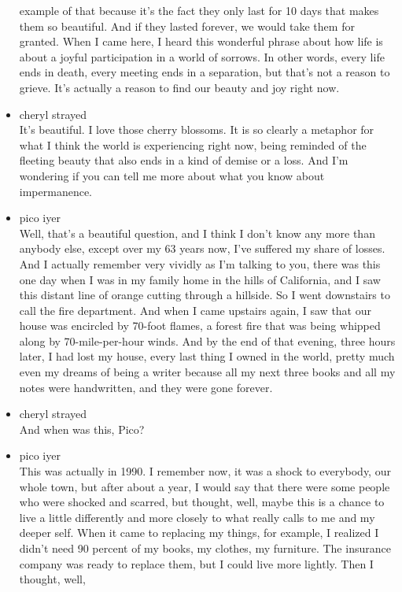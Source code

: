 \begin{itemize}
  example of that because it's the fact they only last for 10 days that
  makes them so beautiful. And if they lasted forever, we would take
  them for granted. When I came here, I heard this wonderful phrase
  about how life is about a joyful participation in a world of sorrows.
  In other words, every life ends in death, every meeting ends in a
  separation, but that's not a reason to grieve. It's actually a reason
  to find our beauty and joy right now.
\item
  cheryl strayed\\
  It's beautiful. I love those cherry blossoms. It is so clearly a
  metaphor for what I think the world is experiencing right now, being
  reminded of the fleeting beauty that also ends in a kind of demise or
  a loss. And I'm wondering if you can tell me more about what you know
  about impermanence.
\item
  pico iyer\\
  Well, that's a beautiful question, and I think I don't know any more
  than anybody else, except over my 63 years now, I've suffered my share
  of losses. And I actually remember very vividly as I'm talking to you,
  there was this one day when I was in my family home in the hills of
  California, and I saw this distant line of orange cutting through a
  hillside. So I went downstairs to call the fire department. And when I
  came upstairs again, I saw that our house was encircled by 70-foot
  flames, a forest fire that was being whipped along by 70-mile-per-hour
  winds. And by the end of that evening, three hours later, I had lost
  my house, every last thing I owned in the world, pretty much even my
  dreams of being a writer because all my next three books and all my
  notes were handwritten, and they were gone forever.
\item
  cheryl strayed\\
  And when was this, Pico?
\item
  pico iyer\\
  This was actually in 1990. I remember now, it was a shock to
  everybody, our whole town, but after about a year, I would say that
  there were some people who were shocked and scarred, but thought,
  well, maybe this is a chance to live a little differently and more
  closely to what really calls to me and my deeper self. When it came to
  replacing my things, for example, I realized I didn't need 90 percent
  of my books, my clothes, my furniture. The insurance company was ready
  to replace them, but I could live more lightly. Then I thought, well,

\end{itemize}

